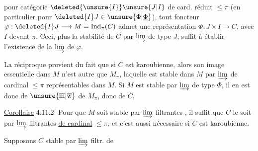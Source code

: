 pour  catégorie $\deleted{\unsure{I}}\unsure{J|I}$ de card. réduit $\leq\pi$ (en particulier pour $\deleted{I}J\in\unsure{\Phi|\underline{\Phi}}$), tout foncteur $\varphi:\deleted{I}J\longrightarrow M=\operatorname{Ind}_\pi(C)$ admet une représentation  $\Phi:J\times I\longrightarrow C$, avec $I$  devant $\pi$. Ceci,  plus la stabilité de $C$ par $\varinjlim$ de type $J$, suffit à établir l'existence de la $\varinjlim$ de $\varphi$.

La réciproque provient du fait que si $C$ est karoubienne, alors son image essentielle dans $M$ n'est autre que $M_\pi$, laquelle est stable dans $M$ par  $\varinjlim$ de cardinal $\leq\pi$ représentables dans $M$.  Si $M$ est stable par $\varinjlim$ de type $\Phi$, il en est donc de $\unsure{\overline{\mathrm m}|\overline{\mathrm w}}$ de $M_\pi$, donc de $C$, 

\uline{Corollaire} 4.11.2. Pour que $M$ soit stable par $\varinjlim$ filtrantes , il suffit que $C$ le soit par $\varinjlim$ filtrantes  \uline{de cardinal} $\leq\pi$, et c'est aussi nécessaire si $C$ est karoubienne.

Supposons $C$ stable par $\varinjlim$ filtr. de
